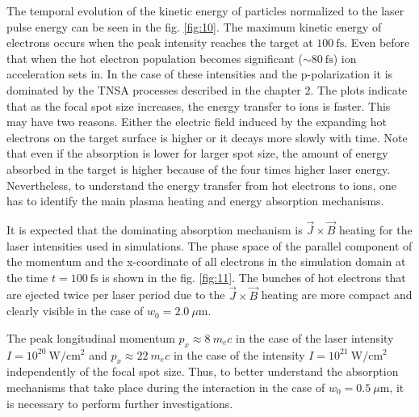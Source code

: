 The temporal evolution of the kinetic energy of particles normalized to the laser pulse energy can be seen in the fig. \ref{fig:10}. The maximum kinetic energy of electrons occurs when the peak intensity reaches the target at $ 100 \ \mathrm{fs} $. Even before that when the hot electron population becomes significant ($ \sim 80 \ \mathrm{fs} $) ion acceleration sets in. In the case of these intensities and the p-polarization it is dominated by the TNSA processes described in the chapter 2. The plots indicate that as the focal spot size increases, the energy transfer to ions is faster. This may have two reasons. Either the electric field induced by the expanding hot electrons on the target surface is higher or it decays more slowly with time. Note that even if the absorption is lower for larger spot size, the amount of energy absorbed in the target is higher because of the four times higher laser energy. Nevertheless, to understand the energy transfer from hot electrons to ions, one has to identify the main plasma heating and energy absorption mechanisms.

It is expected that the dominating absorption mechanism is $ \vec{J} \times \vec{B} $ heating for the laser intensities used in simulations. The phase space of the parallel component of the momentum and the x-coordinate of all electrons in the simulation domain at the time $ t = 100 \ \mathrm{fs} $ is shown in the fig. \ref{fig:11}. The bunches of hot electrons that are ejected twice per laser period due to the $ \vec{J} \times \vec{B} $ heating are more compact and clearly visible in the case of $ w_0 = 2.0 \ \mu\mathrm{m} $.

The peak longitudinal momentum $ p_x \approx 8 \ m_{e} c $ in the case of the laser intensity $ I = 10^{20} \ \mathrm{W/cm^2} $ and $ p_x \approx 22 \ m_{e} c $ in the case of the intensity $ I = 10^{21} \ \mathrm{W/cm^2} $ independently of the focal spot size. Thus, to better understand the absorption mechanisms that take place during the interaction in the case of $ w_0 = 0.5 \ \mu\mathrm{m} $, it is necessary to perform further investigations.

